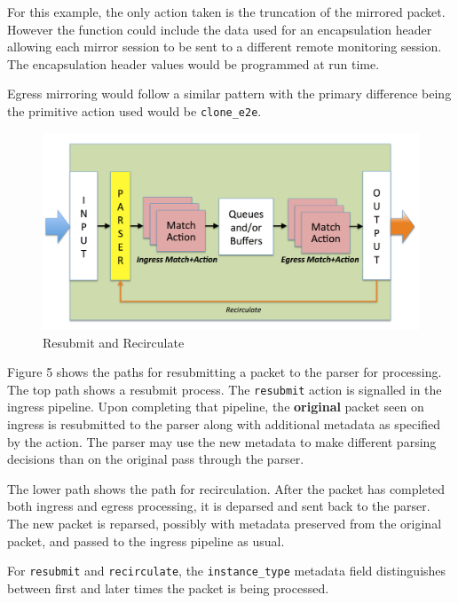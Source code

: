 \documentclass[12pt]{article}
\begin{document}
For this example, the only action taken is the truncation of the mirrored 
packet. However the function could include the data used for an encapsulation 
header allowing each mirror session to be sent to a different remote monitoring 
session. The encapsulation header values would be programmed at run time.

Egress mirroring would follow a similar pattern with the primary difference 
being the primitive action used would be \texttt{clone_e2e}.



\begin{figure}[h!]
    \centering
    \includegraphics[width=\textwidth]{figures/recirculate.png}
    \caption{Resubmit and Recirculate}
    \label{fig:recirc}
\end{figure}

Figure 5 shows the paths for resubmitting a packet to the parser for
processing.  The top path shows a resubmit process.  The
\texttt{resubmit} action is signalled in the ingress pipeline. Upon
completing that pipeline, the \textbf{original} packet seen on ingress
is resubmitted to the parser along with additional metadata as
specified by the action.  The parser may use the new metadata to make
different parsing decisions than on the original pass through the
parser.

The lower path shows the path for recirculation.  After the packet has
completed both ingress and egress processing, it is deparsed and sent
back to the parser.  The new packet is reparsed, possibly with
metadata preserved from the original packet, and passed to the ingress
pipeline as usual.

For \texttt{resubmit} and \texttt{recirculate}, the
\texttt{instance_type} metadata field distinguishes between first and
later times the packet is being processed.
\end{document}
